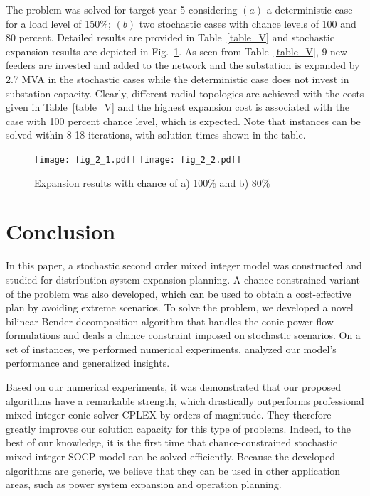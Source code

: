 \documentclass[journal]{IEEEtran}
\theoremstyle{remark}
\begin{document}
The problem was solved for target year 5 considering $(a)$ a deterministic case for a load level of 150\%; $(b)$ two stochastic cases with chance levels of 100 and 80 percent. Detailed results are provided in Table~\ref{table_V} and stochastic expansion results are depicted in Fig.~\ref{fig_2.b}. As seen from Table~\ref{table_V}, 9 new feeders are invested and added to the network and the substation is expanded by 2.7 MVA in the stochastic cases while the deterministic case does not invest in substation capacity. Clearly, different radial topologies are achieved with the costs given in Table~\ref{table_V} and the highest expansion cost is associated
with the case with 100 percent chance level, which is expected. Note that instances can be solved within 8-18 iterations, with solution times shown in the table.\\

\begin{figure}[t]
 \centering
\texttt{[image: fig\_2\_1.pdf]}
\texttt{[image: fig\_2\_2.pdf]}
\caption{Expansion results with chance of a) 100\% and b) 80\%}
\vspace{-10pt}
\label{fig_2.b}
\end{figure}


\section {Conclusion}
In this paper, a stochastic second order mixed integer model was constructed and studied for distribution system expansion planning. A chance-constrained variant of the problem was also developed, which can be used to obtain a cost-effective plan by avoiding extreme scenarios. To solve the problem, we developed a novel bilinear Bender  decomposition  algorithm  that  handles the conic power flow formulations and deals a chance constraint imposed on stochastic scenarios.  On a set of  instances, we performed numerical experiments, analyzed our model's performance and generalized insights.

Based on our numerical experiments, it was demonstrated that our proposed algorithms have a remarkable strength, which drastically outperforms professional mixed integer conic solver CPLEX by orders of magnitude. They therefore greatly improves our solution capacity for this type of problems. Indeed,  to the best of our knowledge, it is the first time that chance-constrained stochastic mixed integer SOCP model can be solved efficiently. Because the developed algorithms are generic, we believe that they can be used in other application areas, such as power system expansion and operation planning.
\end{document}

